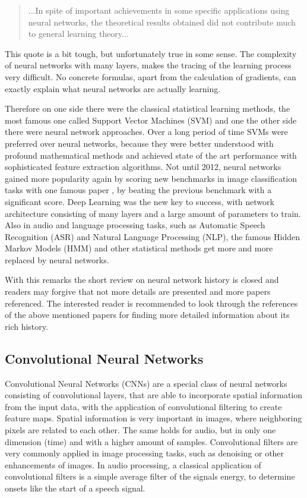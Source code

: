 \begin{quote}
...In spite of important achievements in some specific applications using neural networks, the theoretical results obtained did not contribute much to general learning theory...
\end{quote}

This quote is a bit tough, but unfortunately true in some sense. 
The complexity of neural networks with many layers, makes the tracing of the learning process very difficult.
No concrete formulas, apart from the calculation of gradients, can exactly explain what neural networks are actually learning.

Therefore on one side there were the classical statistical learning methods, the most famous one called Support Vector Machines (SVM) \cite{Cortes1995} and one the other side there were neural network approaches.
Over a long period of time SVMs were preferred over neural networks, because they were better understood with profound mathematical methods and achieved state of the art performance with sophisticated feature extraction algorithms.
Not until 2012, neural networks gained more popularity again by scoring new benchmarks in image classification tasks with one famous paper \cite{Krizhevsky2012}, by beating the previous benchmark with a significant score.
Deep Learning was the new key to success, with network architecture consisting of many layers and a large amount of parameters to train.
Also in audio and language processing tasks, such as Automatic Speech Recognition (ASR) and Natural Language Processing (NLP), the famous Hidden Markov Models (HMM) and other statistical methods get more and more replaced by neural networks.

With this remarks the short review on neural network history is closed and readers may forgive that not more details are presented and more papers referenced.
The interested reader is recommended to look through the references of the above mentioned papers for finding more detailed information about its rich history.



\subsection{Convolutional Neural Networks}\label{sec:prev_nn_cnn}
Convolutional Neural Networks (CNNs) are a special class of neural networks consisting of convolutional layers, that are able to incorporate spatial information from the input data, with the application of convolutional filtering to create feature maps.
Spatial information is very important in images, where neighboring pixels are related to each other.
The same holds for audio, but in only one dimension (time) and with a higher amount of samples.
Convolutional filters are very commonly applied in image processing tasks, such as denoising or other enhancements of images.
In audio processing, a classical application of convolutional filters is a simple average filter of the signals energy, to determine onsets like the start of a speech signal.

